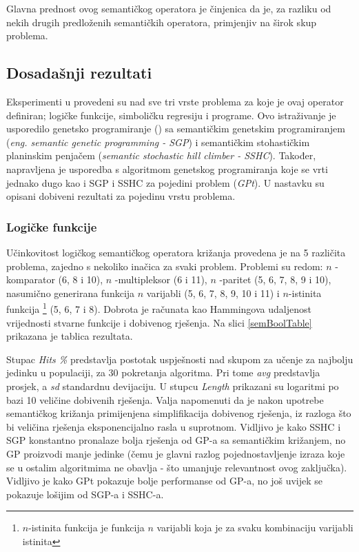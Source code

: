 Glavna prednost ovog semantičkog operatora je činjenica da je, za razliku od nekih drugih predloženih semantičkih operatora, primjenjiv na širok skup problema.

\subsection{Dosadašnji rezultati}

Eksperimenti u \cite{crxSem} provedeni su nad sve tri vrste problema za koje je ovaj operator definiran; logičke funkcije, simboličku regresiju i programe. Ovo istraživanje je usporedilo genetsko programiranje () sa semantičkim genetskim programiranjem (\textit{eng. semantic genetic programming - SGP}) i semantičkim stohastičkim planinskim penjačem (\textit{semantic stochastic hill climber - SSHC}). Također, napravljena je usporedba s algoritmom genetskog programiranja koje se vrti jednako dugo kao i SGP i SSHC za pojedini problem (\textit{GPt}). U nastavku su opisani dobiveni rezultati za pojedinu vrstu problema.

\subsubsection{Logičke funkcije}

Učinkovitost logičkog semantičkog operatora križanja provedena je na 5 različita problema, zajedno s nekoliko inačica za svaki problem. Problemi su redom: $n$ -komparator (6, 8 i 10), $n$ -multipleksor (6 i 11), $n$ -paritet (5, 6, 7, 8, 9 i 10), nasumično generirana funkcija $n$ varijabli (5, 6, 7, 8, 9, 10 i 11) i $n$-istinita funkcija \footnote{$n$-istinita funkcija je funkcija $n$ varijabli koja je za svaku kombinaciju varijabli istinita} (5, 6, 7 i 8). Dobrota je računata kao Hammingova udaljenost vrijednosti stvarne funkcije i dobivenog rješenja. Na slici \ref{semBoolTable} prikazana je tablica rezultata. 

Stupac \textit{Hits \%} predstavlja postotak uspješnosti nad skupom za učenje za najbolju jedinku u populaciji, za 30 pokretanja algoritma. Pri tome \textit{avg} predstavlja prosjek, a \textit{sd} standardnu devijaciju. U stupcu \textit{Length} prikazani su logaritmi po bazi 10 veličine dobivenih rješenja. Valja napomenuti da je nakon upotrebe semantičkog križanja primijenjena simplifikacija dobivenog rješenja, iz razloga što bi veličina rješenja eksponencijalno rasla u suprotnom. Vidljivo je kako SSHC i SGP konstantno pronalaze bolja rješenja od GP-a sa semantičkim križanjem, no GP proizvodi manje jedinke (čemu je glavni razlog pojednostavljenje izraza koje se u ostalim algoritmima ne obavlja - što umanjuje relevantnost ovog zaključka).  Vidljivo je kako GPt pokazuje bolje performanse od GP-a, no još uvijek se pokazuje lošijim od SGP-a i SSHC-a.


